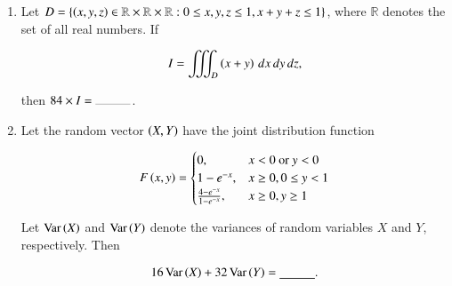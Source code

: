 \documentclass[journal,12pt,onecolumn]{IEEEtran}
\theoremstyle{remark}
\begin{document}
\begin{enumerate}
\item Let $ D = \{ \left(x, y, z\right) \in \mathbb{R} \times \mathbb{R} \times \mathbb{R} : 0 \leq x, y, z \leq 1, x + y + z \leq 1 \} $, where $ \mathbb{R} $ denotes the set of all real numbers. If

\begin{align*}
I = \iiint_D \left(x + y\right) \, dx \, dy \, dz,
\end{align*}

then $ 84 \times I = \rule{1cm}{0.2pt} $.

\item Let the random vector $ \left(X, Y\right) $ have the joint distribution function

\begin{align*}
F\left(x, y\right) = 
\begin{cases} 
0, & x < 0 \text{ or } y < 0 \\
1 - e^{-x}, & x \geq 0, 0 \leq y < 1 \\
\frac{4 - e^{-x}}{1 - e^{-x}}, & x \geq 0, y \geq 1 
\end{cases}
\end{align*}

Let $ \text{Var}\left(X\right) $ and $ \text{Var}\left(Y\right) $ denote the variances of random variables $ X $ and $ Y $, respectively. Then

\begin{align*}
16 \, \text{Var}\left(X\right) + 32 \, \text{Var}\left(Y\right) = \underline{\hspace{1cm}}.
\end{align*}
\end{enumerate}
\end{document}
